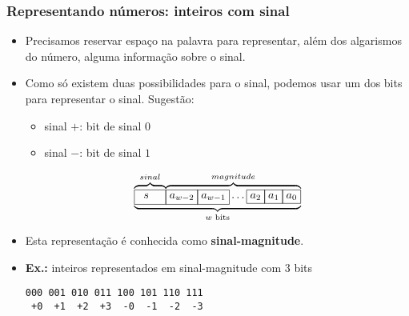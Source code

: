 \documentclass{beamer}
\begin{document}
\begin{frame}[fragile]
\frametitle{Representando números: inteiros com sinal}

\begin{itemize}
\item Precisamos reservar espaço na palavra para representar, além dos algarismos do número, alguma informação sobre o sinal.\pause
\item Como só existem duas possibilidades para o sinal, podemos usar um dos bits para representar o sinal. \pause Sugestão:
\begin{itemize}
\item sinal $+$: bit de sinal $0$
\item sinal $-$: bit de sinal $1$
\end{itemize}
$$
\underbrace{\overbrace{\fbox{$\,\,\,s\!\!\!\!\!\!\phantom{a_{w-1}}$}}^{sinal}\hspace{-2pt}\overbrace{\fbox{$a_{w-2}$}\hspace{-0.5pt}\fbox{$a_{w-1}$}\ldots\fbox{$a_2$}\hspace{-0.5pt}\fbox{$a_1$}\hspace{-0.5pt}\fbox{$a_0$}}^{magnitude}}_{w \text{ bits}}
$$
\item Esta representação é conhecida como \textbf{sinal-magnitude}.
\pause
\item \textbf{Ex.:} inteiros representados em sinal-magnitude com $3$ bits
\begin{Verbatim}[commandchars=\\\{\},codes={\catcode`$=3\catcode`^=7}]
000 001 010 011 100 101 110 111
 +0  +1  +2  +3  -0  -1  -2  -3
\end{Verbatim}
\end{itemize}
\end{frame}
\end{document}
